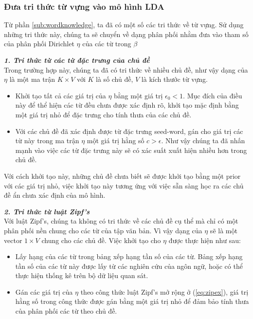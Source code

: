 \documentclass[fontsize=13pt]{scrartcl}
\begin{document}
\subsubsection{Đưa tri thức từ vựng vào mô hình LDA}
Từ phần \ref{sub:wordknowledge}, ta đã có một số các tri thức về từ vựng. Sử dụng những tri thức này, chúng ta sẽ chuyển về dạng phân phối nhằm đưa vào tham số của phân phối Dirichlet $\eta$ của các từ trong $\beta$
\par 
\textbf{\textit{1. Tri thức từ các từ đặc trưng của chủ đề}}\\
Trong trường hợp này, chúng ta đã có tri thức về nhiều chủ đề, như vậy dạng của $\eta$ là một ma trận $K \times V $ với $K$ là số chủ đề, $V$ là kích thước từ vựng.
\begin{itemize}

\item Khởi tạo tất cả các giá trị của $\eta$ bằng một giá trị $\epsilon_0 < 1$. Mục đích của điều này để thể hiện các từ đều chưa được xác định rõ, khởi tạo mặc định bằng một giá trị nhỏ để đặc trưng cho tính thưa của các chủ đề.
\item Với các chủ đề đã xác định được từ đặc trưng seed-word, gán cho giá trị các từ này trong ma trận $\eta$ một giá trị hằng số $c > \epsilon$. Như vậy chúng ta đã nhấn mạnh vào việc các từ đặc trưng này sẽ có xác suất xuất hiện nhiều hơn trong chủ đề.
\end{itemize}
Với cách khởi tạo này, những chủ đề chưa biết sẽ được khởi tạo bằng một prior với các giá trị nhỏ, việc khởi tạo này tương ứng với việc sẵn sàng học ra các chủ đề ẩn chưa xác định của mô hình.
\par
\textbf{\textit{2. Tri thức từ luật Zipf's}}\\
Với luật Zipf's, chúng ta không có tri thức về các chủ đề cụ thể mà chỉ có một phân phối nền chung cho các từ của tập văn bản. Vì vậy dạng của $\eta$ sẽ là một vector $1\times V$ chung cho các chủ đề.
Việc khởi tạo cho $\eta$ được thực hiện như sau:
\begin{itemize}
\item Lấy hạng của các từ trong bảng xếp hạng tần số của các từ. Bảng xếp hạng tần số của các từ này được lấy từ các nghiên cứu của ngôn ngữ, hoặc có thể thực hiện thống kê trên bộ dữ liệu quan sát.
\item Gán các giá trị của $\eta$ theo công thức luật Zipf's mở rộng ở (\ref{eq:zipex}), giá trị hằng số trong công thức được gán bằng một giá trị nhỏ để đảm bảo tính thưa của phân phối các từ theo chủ đề. 
\end{itemize}
\end{document}
